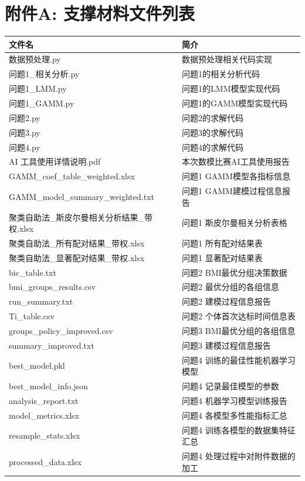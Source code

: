 
{\centering \section*{附件A: 支撑材料文件列表}}

\begin{table}[htbp]
  \centering
  \begin{tabular}{ll}
    \toprule
    文件名 & 简介 \\
    \midrule
    数据预处理.py & 数据预处理相关代码实现 \\
    问题1\_相关分析.py & 问题1的相关分析代码 \\
    问题1\_LMM.py & 问题1的LMM模型实现代码 \\
    问题1\_GAMM.py & 问题1的GAMM模型实现代码 \\
    问题2.py & 问题2的求解代码 \\
    问题3.py & 问题3的求解代码 \\
    问题4.py & 问题4的求解代码 \\
    \midrule
    AI 工具使用详情说明.pdf & 本次数模比赛AI工具使用报告 \\
    GAMM\_coef\_table\_weighted.xlsx & 问题1 GAMM模型各指标信息 \\
    GAMM\_model\_summary\_weighted.txt & 问题1 GAMM建模过程信息报告 \\
    聚类自助法\_斯皮尔曼相关分析结果\_带权.xlsx & 问题1 斯皮尔曼相关分析表格 \\
    聚类自助法\_所有配对结果\_带权.xlsx & 问题1 所有配对结果表 \\
    聚类自助法\_显著配对结果\_带权.xlsx & 问题1 显著配对结果表 \\
    bic\_table.txt & 问题2 BMI最优分组决策数据 \\
    bmi\_groups\_results.csv & 问题2 最优分组的各组信息 \\
    run\_summary.txt & 问题2 建模过程信息报告 \\
    Ti\_table.csv & 问题2 个体首次达标时间信息表 \\
    groups\_policy\_improved.csv & 问题3 BMI最优分组的各组信息 \\
    summary\_improved.txt & 问题3 建模过程信息报告 \\
    best\_model.pkl & 问题4 训练的最佳性能机器学习模型 \\
    best\_model\_info.json & 问题4 记录最佳模型的参数 \\
    analysis\_report.txt & 问题4 机器学习模型训练报告 \\
    model\_metrics.xlsx & 问题4 各模型多性能指标汇总 \\
    resample\_stats.xlsx & 问题4 训练各模型的数据集特征汇总 \\
    processed\_data.xlsx & 问题4 处理过程中对附件数据的加工 \\
    \bottomrule
  \end{tabular}
  \label{tab:file清单}
\end{table}


